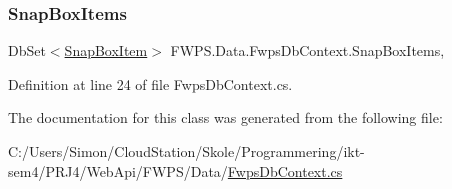 \subsubsection{\texorpdfstring{Snap\+Box\+Items}{SnapBoxItems}}
{\footnotesize\ttfamily Db\+Set$<$\mbox{\hyperlink{class_f_w_p_s_1_1_models_1_1_snap_box_item}{Snap\+Box\+Item}}$>$ F\+W\+P\+S.\+Data.\+Fwps\+Db\+Context.\+Snap\+Box\+Items\hspace{0.3cm}{\ttfamily [get]}, {\ttfamily [set]}}



Definition at line 24 of file Fwps\+Db\+Context.\+cs.



The documentation for this class was generated from the following file\+:\begin{DoxyCompactItemize}
\item 
C\+:/\+Users/\+Simon/\+Cloud\+Station/\+Skole/\+Programmering/ikt-\/sem4/\+P\+R\+J4/\+Web\+Api/\+F\+W\+P\+S/\+Data/\mbox{\hyperlink{_fwps_db_context_8cs}{Fwps\+Db\+Context.\+cs}}\end{DoxyCompactItemize}

